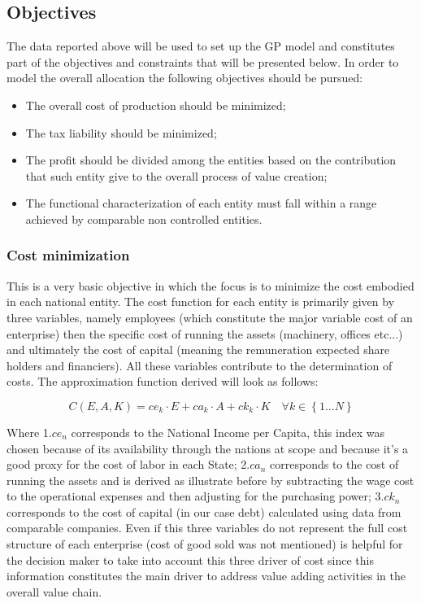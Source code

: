 \documentclass{article}
\begin{document}
\subsection{Objectives}
The data reported above will be used to set up the GP model and constitutes part of the objectives and constraints that will be presented below. In order to model the overall allocation the following objectives should be pursued:
\begin{itemize}
    \item The overall cost of production should be minimized;
    \item The tax liability should be minimized;
    \item The profit should be divided among the entities based on the contribution that such entity give to the overall process of value creation;
    \item The functional characterization of each entity must fall within a range achieved by comparable non controlled entities.
\end{itemize}

\subsubsection{Cost minimization}
This is a very basic objective in which the focus is to  minimize the cost embodied in each national entity. The cost function for each entity is primarily given by three variables, namely employees (which constitute the major variable cost of an enterprise) then the specific cost of running the assets (machinery, offices etc...) and ultimately the cost of capital (meaning the remuneration expected share holders and financiers). All these variables contribute to the determination of costs. The approximation function derived will look as follows:

\begin{equation}
C(E,A,K)=ce_k\cdot E+ca_k\cdot A+ck_k\cdot K \quad \forall k \in \left\{1...N\right\}
\end{equation}

Where 1.$ce_n$ corresponds to the National Income per Capita, this index was chosen because of its availability through the nations at scope and because it's a good proxy for the cost of labor in each State; 2.$ca_n$ corresponds to the cost of running the assets and is derived as illustrate before by subtracting the wage cost to the operational expenses and then adjusting for the purchasing power; 3.$ck_n$ corresponds to the cost of capital (in our case debt) calculated using data from comparable companies.
Even if this three variables do not represent the full cost structure of each enterprise (cost of good sold was not mentioned) is helpful for the decision maker to take into account this three driver of cost since this information constitutes the main driver to address value adding activities in the overall value chain.
\end{document}
